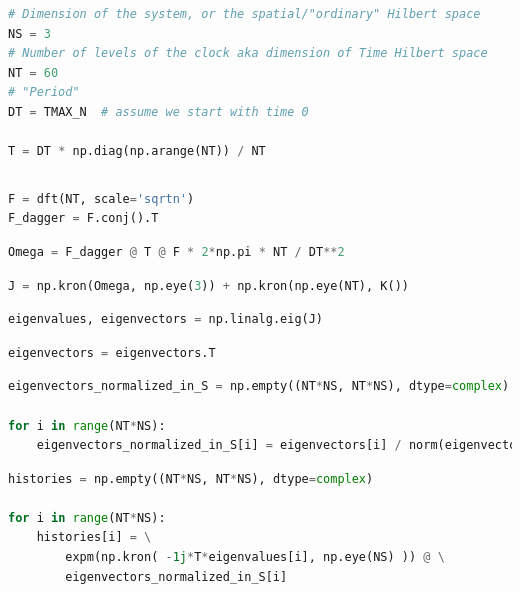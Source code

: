 \begin{lstlisting}[language=Python]
# Dimension of the system, or the spatial/"ordinary" Hilbert space
NS = 3
# Number of levels of the clock aka dimension of Time Hilbert space
NT = 60
# "Period"
DT = TMAX_N  # assume we start with time 0

T = DT * np.diag(np.arange(NT)) / NT
\end{lstlisting}

\begin{lstlisting}[language=Python]
\end{lstlisting}

\begin{lstlisting}[language=Python]
F = dft(NT, scale='sqrtn')
F_dagger = F.conj().T
\end{lstlisting}

\begin{lstlisting}[language=Python]
Omega = F_dagger @ T @ F * 2*np.pi * NT / DT**2
\end{lstlisting}

\begin{lstlisting}[language=Python]
J = np.kron(Omega, np.eye(3)) + np.kron(np.eye(NT), K())
\end{lstlisting}

\begin{lstlisting}[language=Python]
eigenvalues, eigenvectors = np.linalg.eig(J)
\end{lstlisting}

\begin{lstlisting}[language=Python]
eigenvectors = eigenvectors.T
\end{lstlisting}

\begin{lstlisting}[language=Python]
eigenvectors_normalized_in_S = np.empty((NT*NS, NT*NS), dtype=complex)

for i in range(NT*NS):
    eigenvectors_normalized_in_S[i] = eigenvectors[i] / norm(eigenvectors[i][:3])
\end{lstlisting}

\begin{lstlisting}[language=Python]
histories = np.empty((NT*NS, NT*NS), dtype=complex)

for i in range(NT*NS):
    histories[i] = \
        expm(np.kron( -1j*T*eigenvalues[i], np.eye(NS) )) @ \
        eigenvectors_normalized_in_S[i]
\end{lstlisting}

